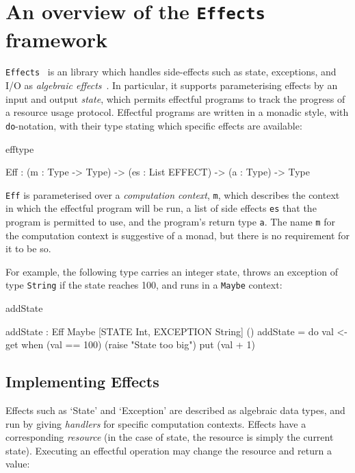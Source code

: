 \section{An overview of the \texttt{Effects} framework}
\label{effects}

\texttt{Effects}~\cite{brady:effects} is an \idris{} library which handles
side-effects such as state, exceptions, and I/O as \emph{algebraic
effects}~\cite{Plotkin2009}. In particular, it supports parameterising effects
by an input and output \emph{state}, which permits effectful programs to track
the progress of a resource usage protocol. Effectful programs are written
in a monadic style, with \texttt{do}-notation, with their type stating which
specific effects are available:

\begin{SaveVerbatim}{efftype}

Eff : (m : Type -> Type) ->
      (es : List EFFECT) -> (a : Type) -> Type

\end{SaveVerbatim}

\noindent
\texttt{Eff} is parameterised over a \emph{computation context}, \texttt{m}, 
which describes the context in which the effectful program will be run, a
list of side effects \texttt{es} that the program is permitted to use, and the
program's return type \texttt{a}. The name \texttt{m} for the computation context is
suggestive of a monad, but there is no requirement for it to be so.

For example, the following type carries an integer state,
throws an exception of type \texttt{String} if the state reaches 100, 
and runs in a \texttt{Maybe} context:

\begin{SaveVerbatim}{addState}

addState : Eff Maybe [STATE Int, EXCEPTION String] ()
addState = do val <- get
              when (val == 100) (raise "State too big")
              put (val + 1)

\end{SaveVerbatim}

\subsection{Implementing Effects}

Effects such as `State' and `Exception' are described as algebraic data types,
and run by giving \emph{handlers} for specific computation contexts. 
Effects have a corresponding \emph{resource} (in the case of state, the
resource is simply the current state). Executing an effectful operation may
change the resource and return a value:

